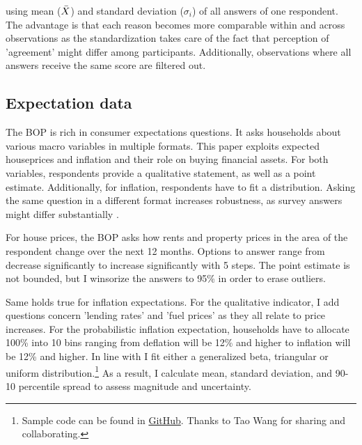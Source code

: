 \documentclass[ProjectABM]{subfiles}
\begin{document}
using mean ($\Bar{X}$) and standard deviation ($\sigma_i$) of all answers of one respondent. The advantage is that each reason becomes more comparable within and across observations as the standardization takes care of the fact that perception of 'agreement' might differ among participants. Additionally, observations where all answers receive the same score are filtered out.
 




\subsection{Expectation data}
The BOP is rich in consumer expectations questions. It asks households about various macro variables in multiple formats. This paper exploits expected houseprices and inflation and their role on buying financial assets. For both variables, respondents provide a qualitative statement, as well as a point estimate. Additionally, for inflation, respondents have to fit a distribution. Asking the same question in a different format increases robustness, as survey answers might differ substantially \cite{potter_et_al_2017prob,diercks2021asymmetric}.

For house prices, the BOP asks how rents and property prices in the area of the respondent change over the next 12 months. Options to answer range from decrease significantly to increase significantly with 5 steps. The point estimate is not bounded, but I winsorize the answers to 95\% in order to erase outliers.

Same holds true for inflation expectations. For the qualitative indicator, I add questions concern 'lending rates' and 'fuel prices' as they all relate to price increases. For the probabilistic inflation expectation, households have to allocate 100\% into 10 bins ranging from deflation will be 12\% and higher to inflation will be 12\% and higher. In line with \cite{engelberg_manski_2009distribution} I fit either a generalized beta, triangular or uniform distribution.\footnote{Sample code can be found in \href{https://github.com/AMonninger/DensitySurveyEstimation}{GitHub}. Thanks to Tao Wang for sharing and collaborating.} As a result, I calculate mean, standard deviation, and 90-10 percentile spread to assess magnitude and uncertainty.
\end{document}
